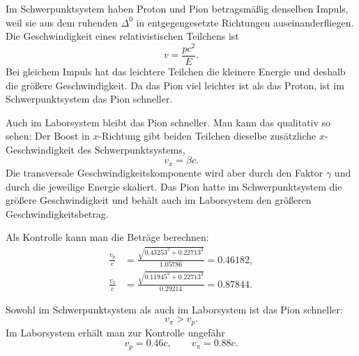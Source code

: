\documentclass[11pt,a4paper]{scrartcl}
\begin{document}
\begin{enumerate}[label=(\alph*)]
            \begin{calculationbox}
                Im Schwerpunktsystem haben Proton und Pion betragsmäßig denselben Impuls, weil
                sie aus dem ruhenden $\Delta^0$ in entgegengesetzte Richtungen auseinanderfliegen.
                Die Geschwindigkeit eines relativistischen Teilchens ist
                \[
                    v=\frac{pc^2}{E}.
                \]
                Bei gleichem Impuls hat das leichtere Teilchen die kleinere Energie und deshalb
                die größere Geschwindigkeit. Da das Pion viel leichter ist als das Proton, ist im
                Schwerpunktsystem das Pion schneller.

                \begin{calculationbox}
                    Auch im Laborsystem bleibt das Pion schneller. Man kann das qualitativ so sehen:
                    Der Boost in $x$-Richtung gibt beiden Teilchen dieselbe zusätzliche
                    $x$-Geschwindigkeit des Schwerpunktsystems,
                    \[
                        v_x=\beta c.
                    \]
                    Die transversale Geschwindigkeitskomponente wird aber durch den Faktor
                    $\gamma$ und durch die jeweilige Energie skaliert. Das Pion hatte im
                    Schwerpunktsystem die größere Geschwindigkeit und behält auch im Laborsystem
                    den größeren Geschwindigkeitsbetrag.
                \end{calculationbox}

                \begin{calculationbox}
                    Als Kontrolle kann man die Beträge berechnen:
                    \begin{align*}
                        \frac{v_p}{c}
                        &=\frac{\sqrt{0.43253^2+0.22713^2}}{1.05786}
                        =0.46182,\\
                        \frac{v_{\pi}}{c}
                        &=\frac{\sqrt{0.11945^2+0.22713^2}}{0.29214}
                        =0.87844.
                    \end{align*}
                \end{calculationbox}
            \end{calculationbox}

            \begin{answerbox}
                Sowohl im Schwerpunktsystem als auch im Laborsystem ist das Pion schneller:
                \[
                    \boxed{v_{\pi}>v_p.}
                \]
                Im Laborsystem erhält man zur Kontrolle ungefähr
                \[
                    \boxed{v_p=0.46c,\qquad v_{\pi}=0.88c.}
                \]
            \end{answerbox}
    \end{enumerate}
\end{document}
